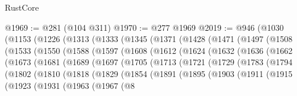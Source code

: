 \begin{lexlean}{RustCore}
\begin{coremodule}
@1969 := @281 (@104 @311)
@1970 := @277 @1969
@2019 := @946
    (@1030
      (@1153
        (@1226
          (@1313
            (@1333
              (@1345
                (@1371
                  (@1428
                    (@1471
                      (@1497
                        (@1508
                          (@1533
                            (@1550
                              (@1588
                                (@1597
                                  (@1608
                                    (@1612
                                      (@1624
                                        (@1632
                                          (@1636
                                            (@1662
                                              (@1673
                                                (@1681
                                                  (@1689
                                                    (@1697
                                                      (@1705
                                                        (@1713
                                                          (@1721
                                                            (@1729
                                                              (@1783
                                                                (@1794
                                                                  (@1802
                                                                    (@1810
                                                                      (@1818
                                                                        (@1829
                                                                          (@1854
                                                                            (@1891
                                                                              (@1895
                                                                                (@1903
                                                                                  (@1911
                                                                                    (@1915
                                                                                      (@1923
                                                                                        (@1931
                                                                                          (@1963
                                                                                            (@1967
                                                                                              (@8

\end{coremodule}
\end{lexlean}

